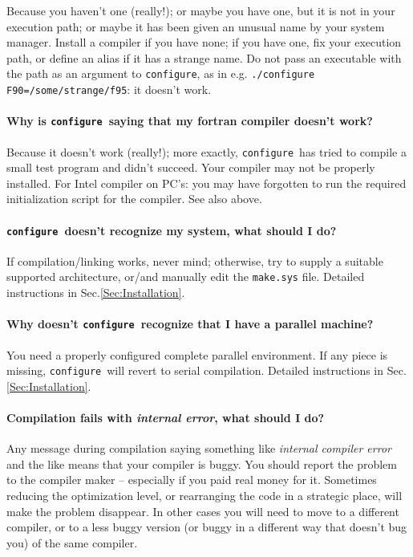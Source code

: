 \documentclass[12pt,a4paper]{article}
\def\configure{\texttt{configure}}
\begin{document}
Because you haven't one (really!); or maybe you have one, but it is not
in your execution path; or maybe it has been given an unusual name by your 
system manager. Install a compiler if you have none; if you have one, fix 
your execution path, or define an alias if it has a strange name. 
Do not pass an executable with the path as an argument to \configure, 
as in e.g. \texttt{./configure F90=/some/strange/f95}: it doesn't work.

\paragraph{Why is \configure\ saying that my fortran compiler doesn't work?}

Because it doesn't work (really!); more exactly, \configure\ has tried 
to compile a small test program and didn't succeed. Your compiler may not be 
properly installed. For Intel compiler on PC's: you may have forgotten to run 
the required initialization script for the compiler. See also above.

\paragraph{\configure\ doesn't recognize my system, what should I do?}

If compilation/linking works, never mind; otherwise, try to supply a suitable  
supported architecture, or/and manually edit the \texttt{make.sys} file. 
Detailed instructions in Sec.\ref{Sec:Installation}.

\paragraph{Why doesn't \configure\ recognize that I have a parallel machine?}

You need a properly configured complete parallel environment. If any piece 
is missing, \configure\ will revert to serial compilation. 
Detailed instructions in Sec.\ref{Sec:Installation}.

\paragraph{Compilation fails with {\em internal error}, what should I do?}

Any message during compilation saying something like {\em internal compiler 
error}
and the like means that your compiler is buggy. You should report the problem 
to the compiler maker -- especially if you paid real money for it.
Sometimes reducing the optimization level, or rearranging the code in a
strategic place, will make the problem disappear. In other cases you 
will need to move to a different compiler, or to a less buggy version
(or buggy in a different way that doesn't bug you) of the same compiler.
\end{document}
